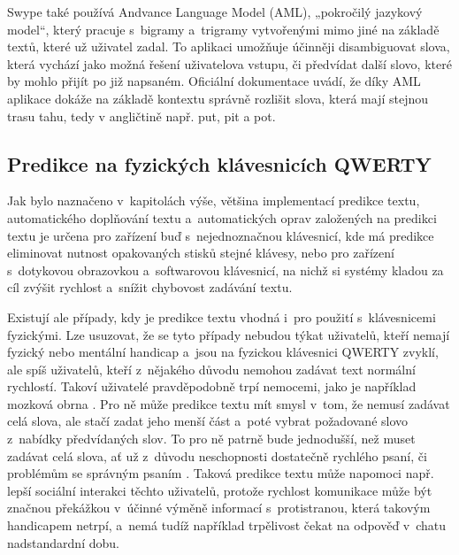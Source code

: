 \documentclass[a4paper,11pt,openany]{book} %
\newcommand\exmp{\textsf}
\begin{document}

Swype také používá Andvance Language Model (AML), „pokročilý jazykový model“, který pracuje s~bigramy a~trigramy vytvořenými mimo jiné na základě textů, které už uživatel zadal. To aplikaci umožňuje účinněji disambiguovat slova, která vychází jako možná řešení uživatelova vstupu, či předvídat další slovo, které by mohlo přijít po již napsaném. Oficiální dokumentace uvádí, že díky AML aplikace dokáže na základě kontextu správně rozlišit slova, která mají stejnou trasu tahu, tedy v angličtině např. \exmp{put}, \exmp{pit} a \exmp{pot}. \parencite{swypehowto}

\subsection{Predikce na fyzických klávesnicích QWERTY}

Jak bylo naznačeno v~kapitolách výše, většina implementací predikce textu, automatického doplňování textu a~automatických oprav založených na predikci textu je určena pro zařízení buď s~nejednoznačnou klávesnicí, kde má predikce eliminovat nutnost opakovaných stisků stejné klávesy, nebo pro zařízení s~dotykovou obrazovkou a~softwarovou klávesnicí, na nichž si systémy kladou za cíl zvýšit rychlost a~snížit chybovost zadávání textu. 

Existují ale případy, kdy je predikce textu vhodná i~pro použití s~klávesnicemi fyzickými. Lze usuzovat, že se tyto případy nebudou týkat uživatelů, kteří nemají fyzický nebo mentální handicap a~jsou na fyzickou klávesnici QWERTY zvyklí, ale spíš uživatelů, kteří z~nějakého důvodu nemohou zadávat text normální rychlostí. Takoví uživatelé pravděpodobně trpí nemocemi, jako je například mozková obrna \parencite[1--2]{philgadomski}. Pro ně může predikce textu mít smysl v~tom, že nemusí zadávat celá slova, ale stačí zadat jeho menší část a~poté vybrat požadované slovo z~nabídky předvídaných slov. To pro ně patrně bude jednodušší, než muset zadávat celá slova, ať už z~důvodu neschopnosti dostatečně rychlého psaní, či problémům se správným psaním \parencite{penfriend2014}. %
Taková predikce textu může napomoci např. lepší sociální interakci těchto uživatelů, protože rychlost komunikace může být značnou překážkou v~účinné výměně informací s~protistranou, která takovým handicapem netrpí, a~nemá tudíž například trpělivost čekat na odpověď v~chatu nadstandardní dobu. %
\end{document}
